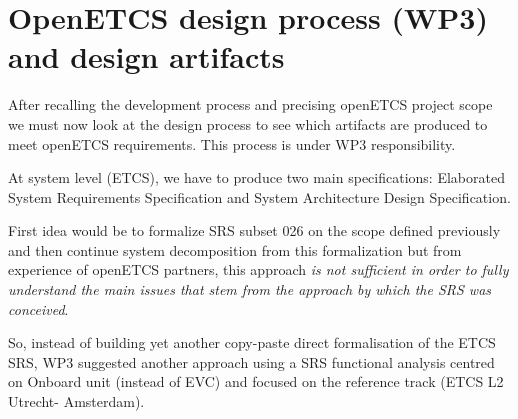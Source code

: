 \documentclass[11pt]{template/openetcs_report}
\begin{document}
\section{OpenETCS design process (WP3) and design artifacts}
\label{InterestOfReferenceEngineeringArtefacts}
After recalling the development process and precising openETCS project scope we must now look at the design process to see which artifacts are produced to meet openETCS requirements. This process is under WP3 responsibility.

\label{DesignProcessStrategy}

At system level (ETCS), we have to produce two main specifications: Elaborated System Requirements Specification and System Architecture Design Specification.

First idea would be to formalize SRS subset 026 on the scope defined previously and then continue system decomposition from this formalization but from experience of openETCS partners, this approach \textit{is not sufficient in order to fully understand the main issues that stem from the approach by which the SRS was conceived}.

So, instead of building yet another copy-paste direct formalisation of the ETCS SRS, WP3 suggested another approach using a SRS functional analysis centred on Onboard unit (instead of EVC) and focused on the reference track (ETCS L2 Utrecht- Amsterdam).
\end{document}
